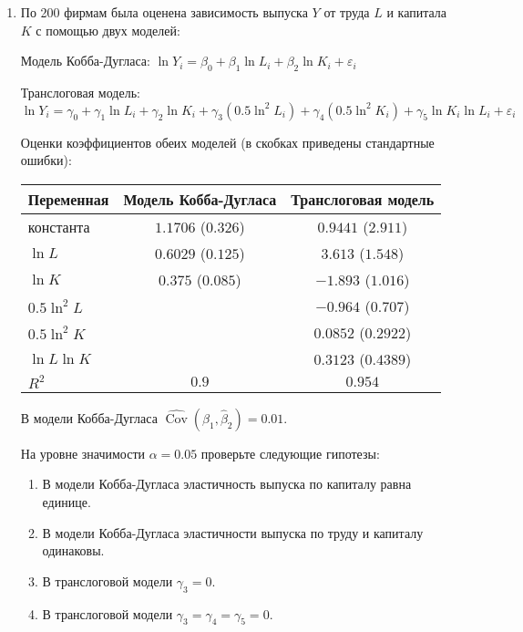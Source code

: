 \documentclass[12pt]{article}
\DeclareMathOperator{\Cov}{Cov}
\def \hb{\hat{\beta}}
\def \hCov{\widehat{\Cov}}
\begin{document}
\begin{enumerate}

\item
По 200 фирмам была оценена зависимость выпуска $Y$ от труда $L$ и капитала $K$
с помощью двух моделей:

Модель Кобба-Дугласа: $\ln{Y_i} = \beta_0 + \beta_1 \ln{L_i} + \beta_2 \ln{K_i} +
\varepsilon_i$

Транслоговая модель: $\ln{Y_i} = \gamma_0 + \gamma_1 \ln{L_i} + \gamma_2 \ln{K_i} +
\gamma_3 (0.5 \ln^2{L_i}) + \gamma_4 (0.5 \ln^2{K_i}) + \gamma_5 \ln{K_i} \ln{L_i} +
\varepsilon_i$

Оценки коэффициентов обеих моделей (в скобках приведены стандартные ошибки):

\begin{tabular}{lcc}
\toprule
Переменная & Модель Кобба-Дугласа & Транслоговая модель \\
\midrule
константа & $1.1706$ ($0.326$) & $0.9441$ ($2.911$)   \\
$\ln L$ & $0.6029$ ($0.125$) & $3.613$ ($1.548$)  \\
$\ln K$ & $0.375$ ($0.085$) & $-1.893$ ($1.016$)  \\
$0.5 \ln^2 L$ &  & $-0.964$ ($0.707$)  \\
$0.5 \ln^2 K$ & & $0.0852$ ($0.2922$) \\
$\ln L \ln K$ & & $0.3123$ ($0.4389$)  \\
$R^2$ & $0.9$ & $0.954$  \\
\bottomrule
\end{tabular}

В модели Кобба-Дугласа $\hCov(\hb_1, \hb_2)= 0.01$.

На уровне значимости $\alpha = 0.05$ проверьте следующие гипотезы:
\begin{enumerate}
\item В модели Кобба-Дугласа эластичность выпуска по капиталу равна единице.
\item В модели Кобба-Дугласа эластичности выпуска по труду и капиталу одинаковы.
\item В транслоговой модели $\gamma_3 = 0$.
\item В транслоговой модели $\gamma_3 = \gamma_4 = \gamma_5 = 0$.
\end{enumerate}




\end{enumerate}
\end{document}
